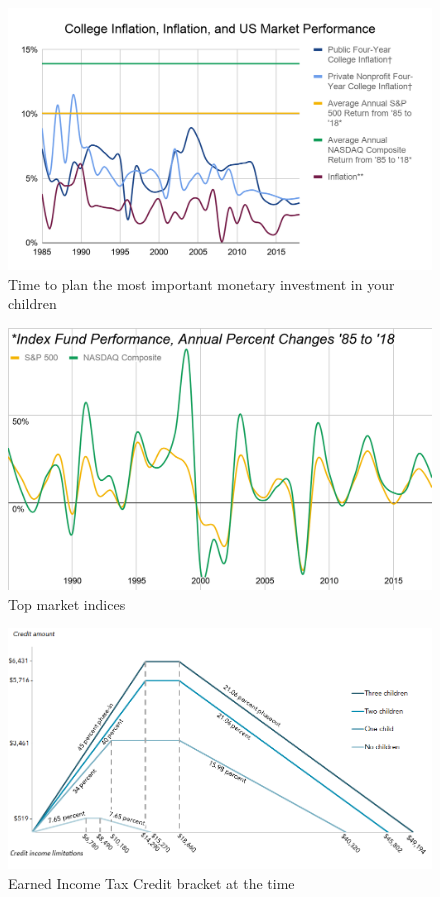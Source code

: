 \documentclass{article}
\begin{document}
\begin{figure}[!htb]
    \centering
    \includegraphics[width=\textwidth]{imgs/2.png}
    \caption{Time to plan the most important monetary investment in your children}
\end{figure}

\vspace{10pt}

\begin{figure}[!htb]
    \centering
    \includegraphics[width=\textwidth]{imgs/3.png}
    \caption{Top market indices}
\end{figure}

\vspace{10pt}

\begin{figure}[!htb]
    \centering
    \includegraphics[width=\textwidth]{imgs/4.png}
    \caption{Earned Income Tax Credit bracket at the time}
\end{figure}
\end{document}
